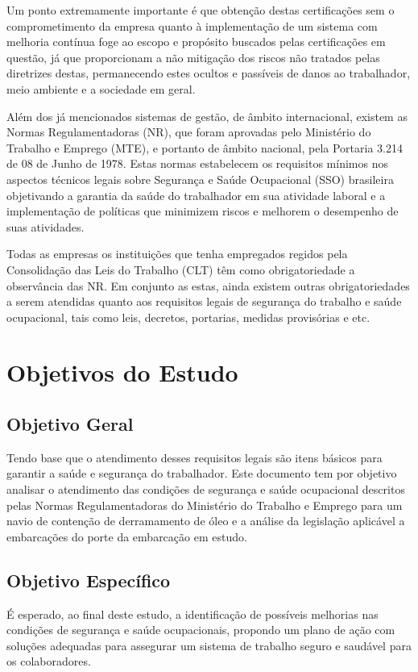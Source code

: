 Um ponto extremamente importante é que obtenção destas certificações sem o comprometimento da empresa quanto à implementação de um sistema com melhoria contínua foge ao escopo e propósito buscados pelas certificações em questão, já que proporcionam a não mitigação dos riscos não tratados pelas diretrizes destas, permanecendo estes ocultos e passíveis de danos ao trabalhador, meio ambiente e a sociedade em geral.

Além dos já mencionados sistemas de gestão, de âmbito internacional, existem as Normas Regulamentadoras (NR), que foram aprovadas pelo Ministério do Trabalho e Emprego (MTE), e portanto de âmbito nacional, pela Portaria 3.214 de 08 de Junho de 1978. Estas normas estabelecem os requisitos mínimos nos aspectos técnicos legais sobre Segurança e Saúde Ocupacional (SSO) brasileira objetivando a garantia da saúde do trabalhador em sua atividade laboral e a implementação de políticas que minimizem riscos e melhorem o desempenho de suas atividades.

Todas as empresas os instituições que tenha empregados regidos pela Consolidação das Leis do Trabalho (CLT) têm como obrigatoriedade a observância das NR. Em conjunto as estas, ainda existem outras obrigatoriedades a serem atendidas quanto aos requisitos legais de segurança do trabalho e saúde ocupacional, tais como leis, decretos, portarias, medidas provisórias e etc.

\section{Objetivos do Estudo}
\subsection{Objetivo Geral}
Tendo base que o atendimento desses requisitos legais são itens básicos para garantir a saúde e segurança do trabalhador. Este documento tem por objetivo analisar o atendimento das condições de segurança e saúde ocupacional descritos pelas Normas Regulamentadoras do Ministério do Trabalho e Emprego para um navio de contenção de derramamento de óleo e a análise da legislação aplicável a embarcações do porte da embarcação em estudo.
\subsection{Objetivo Específico}
É esperado, ao final deste estudo, a identificação de possíveis melhorias nas condições de segurança e saúde ocupacionais, propondo um plano de ação com soluções adequadas para assegurar um sistema de trabalho seguro e saudável para os colaboradores.

